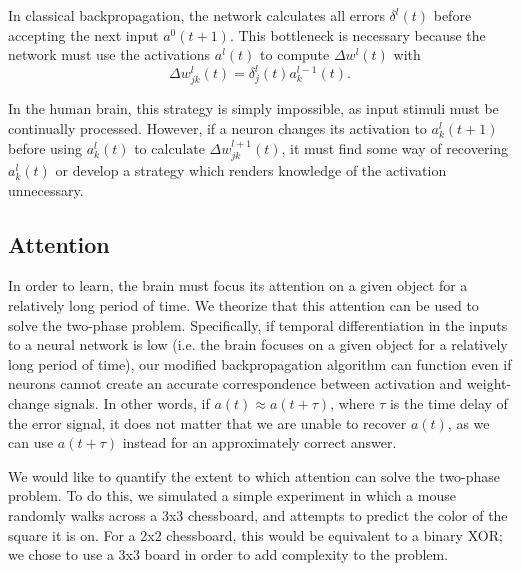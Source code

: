 \documentclass[12pt]{article}
\begin{document}
In classical backpropagation, the network calculates all errors $\delta^l(t)$ before accepting the next input $a^0(t+1)$. This bottleneck is necessary because the network must use the activations $a^l(t)$ to compute $\Delta w^l(t)$ with
\begin{equation}
	\Delta w_{jk}^l(t) = \delta^l_j(t)a_k^{l-1}(t).
\end{equation}

In the human brain, this strategy is simply impossible, as input stimuli must be continually processed. However, if a neuron changes its activation to $a^l_k(t+1)$ before using $a^l_k(t)$ to calculate $\Delta w_{jk}^{l+1}(t)$, it must find some way of recovering $a^l_k(t)$ or develop a strategy which renders knowledge of the activation unnecessary.

\subsection{Attention}
In order to learn, the brain must focus its attention on a given object for a relatively long period of time. \cite{Desimone2014} We theorize that this attention can be used to solve the two-phase problem. Specifically, if temporal differentiation in the inputs to a neural network is low (i.e. the brain focuses on a given object for a relatively long period of time), our modified backpropagation algorithm can function even if neurons cannot create an accurate correspondence between activation and weight-change signals. In other words, if $a(t)\approx a(t+\tau)$, where $\tau$ is the time delay of the error signal, it does not matter that we are unable to recover $a(t)$, as we can use $a(t+\tau)$ instead for an approximately correct answer.

We would like to quantify the extent to which attention can solve the two-phase problem. To do this, we simulated a simple experiment in which a mouse randomly walks across a 3x3 chessboard, and attempts to predict the color of the square it is on. For a 2x2 chessboard, this would be equivalent to a binary XOR; we chose to use a 3x3 board in order to add complexity to the problem.
\end{document}
